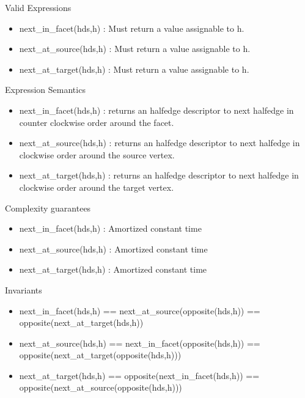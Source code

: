 \begin{Desc}
\item[Valid Expressions]\begin{itemize}
\item next\_\-in\_\-facet(hds,h) : Must return a value assignable to h.\item next\_\-at\_\-source(hds,h) : Must return a value assignable to h.\item next\_\-at\_\-target(hds,h) : Must return a value assignable to h.\end{itemize}
\end{Desc}
\begin{Desc}
\item[Expression Semantics]\begin{itemize}
\item next\_\-in\_\-facet(hds,h) : returns an halfedge descriptor to next halfedge in counter clockwise order around the facet.\item next\_\-at\_\-source(hds,h) : returns an halfedge descriptor to next halfedge in clockwise order around the source vertex.\item next\_\-at\_\-target(hds,h) : returns an halfedge descriptor to next halfedge in clockwise order around the target vertex.\end{itemize}
\end{Desc}
\begin{Desc}
\item[Complexity guarantees]\begin{itemize}
\item next\_\-in\_\-facet(hds,h) : Amortized constant time\item next\_\-at\_\-source(hds,h) : Amortized constant time\item next\_\-at\_\-target(hds,h) : Amortized constant time\end{itemize}
\end{Desc}
\begin{Desc}
\item[Invariants ]\begin{itemize}
\item next\_\-in\_\-facet(hds,h) == next\_\-at\_\-source(opposite(hds,h)) == opposite(next\_\-at\_\-target(hds,h))\item next\_\-at\_\-source(hds,h) == next\_\-in\_\-facet(opposite(hds,h)) == opposite(next\_\-at\_\-target(opposite(hds,h)))\item next\_\-at\_\-target(hds,h) == opposite(next\_\-in\_\-facet(hds,h)) == opposite(next\_\-at\_\-source(opposite(hds,h)))\end{itemize}
\end{Desc}
